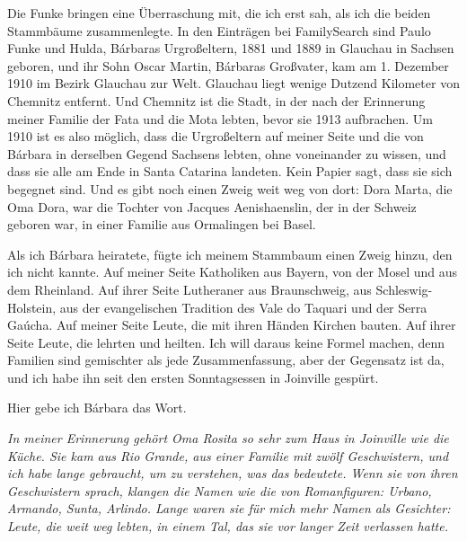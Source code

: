\documentclass[
  ngerman,
  11pt,
  openany]{book}
\begin{document}
Die Funke bringen eine Überraschung mit, die ich erst sah, als ich die
beiden Stammbäume zusammenlegte. In den Einträgen bei FamilySearch sind
Paulo Funke und Hulda, Bárbaras Urgroßeltern, 1881 und 1889 in Glauchau
in Sachsen geboren, und ihr Sohn Oscar Martin, Bárbaras Großvater, kam
am 1. Dezember 1910 im Bezirk Glauchau zur Welt. Glauchau liegt wenige
Dutzend Kilometer von Chemnitz entfernt. Und Chemnitz ist die Stadt, in
der nach der Erinnerung meiner Familie der Fata und die Mota lebten,
bevor sie 1913 aufbrachen. Um 1910 ist es also möglich, dass die
Urgroßeltern auf meiner Seite und die von Bárbara in derselben Gegend
Sachsens lebten, ohne voneinander zu wissen, und dass sie alle am Ende
in Santa Catarina landeten. Kein Papier sagt, dass sie sich begegnet
sind. Und es gibt noch einen Zweig weit weg von dort: Dora Marta, die
Oma Dora, war die Tochter von Jacques Aenishaenslin, der in der Schweiz
geboren war, in einer Familie aus Ormalingen bei Basel.

Als ich Bárbara heiratete, fügte ich meinem Stammbaum einen Zweig hinzu,
den ich nicht kannte. Auf meiner Seite Katholiken aus Bayern, von der
Mosel und aus dem Rheinland. Auf ihrer Seite Lutheraner aus
Braunschweig, aus Schleswig-Holstein, aus der evangelischen Tradition
des Vale do Taquari und der Serra Gaúcha. Auf meiner Seite Leute, die
mit ihren Händen Kirchen bauten. Auf ihrer Seite Leute, die lehrten und
heilten. Ich will daraus keine Formel machen, denn Familien sind
gemischter als jede Zusammenfassung, aber der Gegensatz ist da, und ich
habe ihn seit den ersten Sonntagsessen in Joinville gespürt.

Hier gebe ich Bárbara das Wort.

\emph{In meiner Erinnerung gehört Oma Rosita so sehr zum Haus in
Joinville wie die Küche. Sie kam aus Rio Grande, aus einer Familie mit
zwölf Geschwistern, und ich habe lange gebraucht, um zu verstehen, was
das bedeutete. Wenn sie von ihren Geschwistern sprach, klangen die Namen
wie die von Romanfiguren: Urbano, Armando, Sunta, Arlindo. Lange waren
sie für mich mehr Namen als Gesichter: Leute, die weit weg lebten, in
einem Tal, das sie vor langer Zeit verlassen hatte.}
\end{document}
